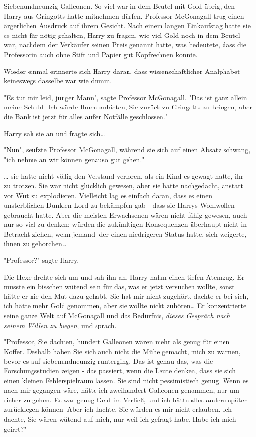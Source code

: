 {Siebenundneunzig Galleonen. So viel war in dem Beutel mit Gold übrig, den Harry aus Gringotts hatte mitnehmen dürfen. Professor McGonagall trug einen ärgerlichen Ausdruck auf ihrem Gesicht. Nach einem langen Einkaufstag hatte sie es nicht für nötig gehalten, Harry zu fragen, wie viel Gold noch in dem Beutel war, nachdem der Verkäufer seinen Preis genannt hatte, was bedeutete, dass die Professorin auch ohne Stift und Papier gut Kopfrechnen konnte.

Wieder einmal erinnerte sich Harry daran, dass wissenschaftlicher Analphabet keineswegs dasselbe war wie dumm.

"Es tut mir leid, junger Mann", sagte Professor McGonagall. "Das ist ganz allein meine Schuld. Ich würde Ihnen anbieten, Sie zurück zu Gringotts zu bringen, aber die Bank ist jetzt für alles außer Notfälle geschlossen."

Harry sah sie an und fragte sich…

"Nun", seufzte Professor McGonagall, während sie sich auf einen Absatz schwang, "ich nehme an wir können genauso gut gehen."

… sie hatte nicht völlig den Verstand verloren, als ein Kind es gewagt hatte, ihr zu trotzen. Sie war nicht glücklich gewesen, aber sie hatte nachgedacht, anstatt vor Wut zu explodieren. Vielleicht lag es einfach daran, dass es einen unsterblichen Dunklen Lord zu bekämpfen gab - dass sie Harrys Wohlwollen gebraucht hatte. Aber die meisten Erwachsenen wären nicht fähig gewesen, auch nur so viel zu denken; würden die zukünftigen Konsequenzen überhaupt nicht in Betracht ziehen, wenn jemand, der einen niedrigeren Status hatte, sich weigerte, ihnen zu gehorchen…

"Professor?" sagte Harry.

Die Hexe drehte sich um und sah ihn an. Harry nahm einen tiefen Atemzug. Er musste ein bisschen wütend sein für das, was er jetzt versuchen wollte, sonst hätte er nie den Mut dazu gehabt. Sie hat mir nicht zugehört, dachte er bei sich, ich hätte mehr Gold genommen, aber sie wollte nicht zuhören… Er konzentrierte seine ganze Welt auf McGonagall und das Bedürfnis, \emph{dieses Gespräch nach seinem Willen zu biegen}, und sprach.

"Professor, Sie dachten, hundert Galleonen wären mehr als genug für einen Koffer. Deshalb haben Sie sich auch nicht die Mühe gemacht, mich zu warnen, bevor es auf siebenundneunzig runterging. Das ist genau das, was die Forschungsstudien zeigen - das passiert, wenn die Leute denken, dass sie sich einen kleinen Fehlerspielraum lassen. Sie sind nicht pessimistisch genug. Wenn es nach mir gegangen wäre, hätte ich zweihundert Galleonen genommen, nur um sicher zu gehen. Es war genug Geld im Verließ, und ich hätte alles andere später zurücklegen können. Aber ich dachte, Sie würden es mir nicht erlauben. Ich dachte, Sie wären wütend auf mich, nur weil ich gefragt habe. Habe ich mich geirrt?"

}
